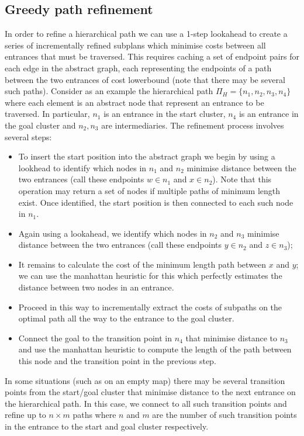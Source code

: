 \subsection{Greedy path refinement}
In order to refine a hierarchical path we can use a 1-step lookahead to create a series of incrementally refined subplans which minimise costs between all entrances that must be traversed.
This requires caching a set of endpoint pairs for each edge in the abstract graph, each representing the endpoints of a path between the two entrances of cost lowerbound (note that there may be several such paths).
Consider as an example the hierarchical path $\Pi_{H} = \lbrace n_{1}, n_{2}, n_{3}, n_{4} \rbrace$ where each element is an abstract node that represent an entrance to be traversed.
In particular, $n_{1}$ is an entrance in the start cluster, $n_{4}$ is an entrance in the goal cluster and $n_{2}, n_{3}$ are intermediaries. 
The refinement process involves several steps:
\begin{itemize}
\item{To insert the start position into the abstract graph we begin by using a lookhead to identify which nodes in $n_{1}$  and $n_{2}$ minimise distance between the two entrances (call these endpoints $w \in n_{1}$ and $x \in n_{2}$). 
Note that this operation may return a set of nodes if multiple paths of minimum length exist.
Once identified, the start position is then connected to each such node in $n_{1}$.}
\item{Again using a lookahead, we identify which nodes in $n_{2}$ and $n_{3}$ minimise distance between the two entrances (call these endpoints $y \in n_{2}$ and $z \in n_{3}$);}
\item{It remains to calculate the cost of the minimum length path between $x$ and $y$; we can use the manhattan heuristic for this which perfectly estimates the distance between two nodes in an entrance.}
\item{Proceed in this way to incrementally extract the costs of subpaths on the optimal path all the way to the entrance to the goal cluster.} 
\item{Connect the goal to the transition point in $n_{4}$ that minimise distance to $n_{3}$ and use the manhattan heuristic to compute the length of the path between this node and the transition point in the previous step. }
\end{itemize}
In some situations (such as on an empty map) there may be several transition points from the start/goal cluster that minimise distance to the next entrance on the hierarchical path. 
In this case, we connect to all such transition points and refine up to $n \times m$ paths where $n$ and $m$ are the number of such transition points in the entrance to the start and goal cluster respectively.

